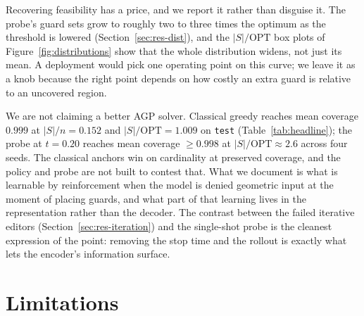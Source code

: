\documentclass[preprint,10pt]{elsarticle}
\newcommand{\OPT}{\mathrm{OPT}}
\begin{document}
Recovering feasibility has a price, and we report it rather than disguise it. The probe's guard sets grow to roughly two to three times the optimum as the threshold is lowered (Section~\ref{sec:res-dist}), and the $|S|/\OPT$ box plots of Figure~\ref{fig:distributions} show that the whole distribution widens, not just its mean. A deployment would pick one operating point on this curve; we leave it as a knob because the right point depends on how costly an extra guard is relative to an uncovered region.

We are not claiming a better AGP solver. Classical greedy reaches mean coverage $0.999$ at $|S|/n = 0.152$ and $|S|/\OPT = 1.009$ on \texttt{test} (Table~\ref{tab:headline}); the probe at $t=0.20$ reaches mean coverage $\geq 0.998$ at $|S|/\OPT \approx 2.6$ across four seeds. The classical anchors win on cardinality at preserved coverage, and the policy and probe are not built to contest that. What we document is what is learnable by reinforcement when the model is denied geometric input at the moment of placing guards, and what part of that learning lives in the representation rather than the decoder. The contrast between the failed iterative editors (Section~\ref{sec:res-iteration}) and the single-shot probe is the cleanest expression of the point: removing the stop time and the rollout is exactly what lets the encoder's information surface.

\section{Limitations}
\label{sec:limitations}
\end{document}
